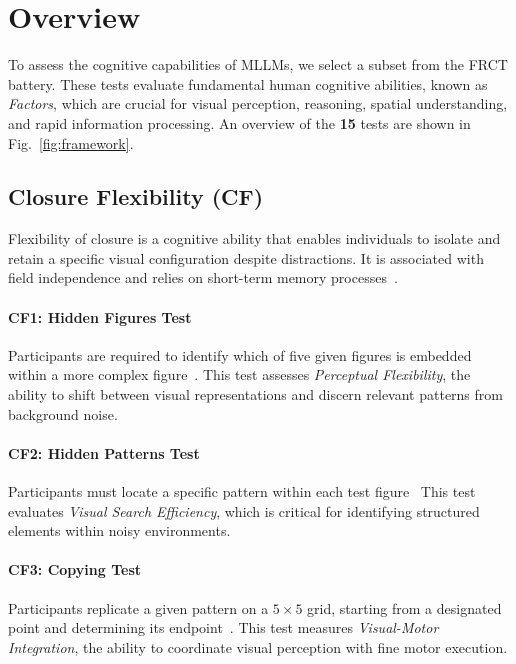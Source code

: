 \section{{\methodname} Overview}

To assess the cognitive capabilities of MLLMs, we select a subset from the FRCT battery.
These tests evaluate fundamental human cognitive abilities, known as \textit{Factors}, which are crucial for visual perception, reasoning, spatial understanding, and rapid information processing.
An overview of the \textbf{15} tests are shown in Fig.~\ref{fig:framework}.

\subsection{Closure Flexibility (CF)}

Flexibility of closure is a cognitive ability that enables individuals to isolate and retain a specific visual configuration despite distractions.
It is associated with field independence and relies on short-term memory processes~\cite{wardell1973possible}.

\paragraph{CF1: Hidden Figures Test}

Participants are required to identify which of five given figures is embedded within a more complex figure~\cite{crutchfield1952gottschaldt}.
This test assesses \textit{Perceptual Flexibility}, the ability to shift between visual representations and discern relevant patterns from background noise.

\paragraph{CF2: Hidden Patterns Test}

Participants must locate a specific pattern within each test figure~\cite{thurstone1938perceptual}
This test evaluates \textit{Visual Search Efficiency}, which is critical for identifying structured elements within noisy environments.

\paragraph{CF3: Copying Test}

Participants replicate a given pattern on a $5\times5$ grid, starting from a designated point and determining its endpoint~\cite[41]{thurstone1938primary}.
This test measures \textit{Visual-Motor Integration}, the ability to coordinate visual perception with fine motor execution.

